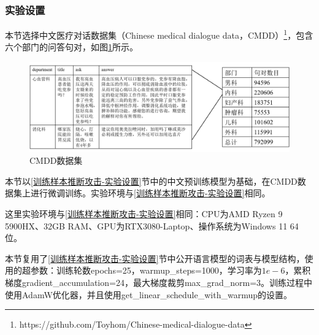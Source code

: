 \subsubsection{实验设置} \label{chap3_exp_setting}



本节选择中文医疗对话数据集（Chinese medical dialogue data，CMDD）\footnote{https://github.com/Toyhom/Chinese-medical-dialogue-data}，包含六个部门的问答句对，如图\ref{CMDD_Data}所示。

\begin{figure}[h]
	\centering
	\includegraphics[width=\linewidth]{figures/CMDD_Data.png}
	\caption{CMDD数据集}
	\label{CMDD_Data}
\end{figure}



本节以\ref{训练样本推断攻击-实验设置}节中的中文预训练模型为基础，在CMDD数据集上进行微调训练。实验环境与\ref{训练样本推断攻击-实验设置}相同。

这里实验环境与\ref{训练样本推断攻击-实验设置}相同：CPU为AMD Ryzen 9 5900HX、32GB RAM、GPU为RTX3080-Laptop、操作系统为Windows 11 64位。

本节复用了\ref{训练样本推断攻击-实验设置}节中公开语言模型的词表与模型结构，使用的超参数：训练轮数epochs=25，warmup\_steps=1000，学习率为$1e-6$，累积梯度gradient\_accumulation=24，最大梯度裁剪max\_grad\_norm=3。训练过程中使用AdamW优化器，并且使用get\_linear\_schedule\_with\_warmup的设置。


